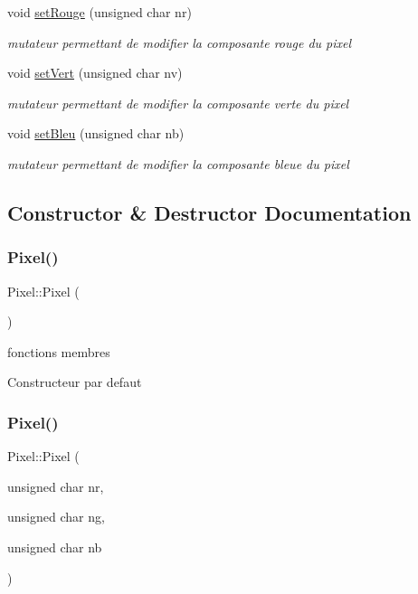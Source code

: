 \begin{DoxyCompactItemize}
void \mbox{\hyperlink{classPixel_a46ffac40207a65c1481afcb2b156e433}{set\+Rouge}} (unsigned char nr)
\begin{DoxyCompactList}\small\item\em mutateur permettant de modifier la composante rouge du pixel \end{DoxyCompactList}\item 
void \mbox{\hyperlink{classPixel_a3678479783c7c839ee653be96a7e0757}{set\+Vert}} (unsigned char nv)
\begin{DoxyCompactList}\small\item\em mutateur permettant de modifier la composante verte du pixel \end{DoxyCompactList}\item 
void \mbox{\hyperlink{classPixel_a706ee4cd16d1098fab21c727c90cb00b}{set\+Bleu}} (unsigned char nb)
\begin{DoxyCompactList}\small\item\em mutateur permettant de modifier la composante bleue du pixel \end{DoxyCompactList}\end{DoxyCompactItemize}


\subsection{Constructor \& Destructor Documentation}
\mbox{\label{classPixel_a27ad99a2f705e635c42d242d530d4756}} 
\subsubsection{\texorpdfstring{Pixel()}{Pixel()}\hspace{0.1cm}{\footnotesize\ttfamily [1/2]}}
{\footnotesize\ttfamily Pixel\+::\+Pixel (\begin{DoxyParamCaption}{ }\end{DoxyParamCaption})}



fonctions membres 

Constructeur par defaut \mbox{\label{classPixel_ae14440155731c2f7e2073b7bbbd596f3}} 
\subsubsection{\texorpdfstring{Pixel()}{Pixel()}\hspace{0.1cm}{\footnotesize\ttfamily [2/2]}}
{\footnotesize\ttfamily Pixel\+::\+Pixel (\begin{DoxyParamCaption}\item[{unsigned char}]{nr,  }\item[{unsigned char}]{ng,  }\item[{unsigned char}]{nb }\end{DoxyParamCaption})}



